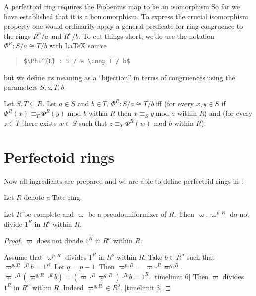 \documentclass[11pt]{article}
\begin{document}
A perfectoid ring requires the Frobenius map to be an isomorphism
So far we have established that it is a homomorphism.
To express the crucial isomorphism  property one would ordinarily 
apply a general predicate for ring congruence to the rings
$R^o/a$ and $R^o/b$. To cut things short, we do use the notation
$\Phi^{R} : S / a \cong T / b$ with 
\LaTeX{} source 
\begin{quotation}
\verb|$\Phi^{R} : S / a \cong T / b$|
\end{quotation}
but we define its meaning as a ``bijection'' in terms of congruences using the 
parameters $S,a,T,b$.
\begin{forthel}

\begin{definition} Let $S,T \subseteq R$. Let $a \in S$ and $b \in T$. 
$\Phi^{R} : S / a \cong T / b$
iff
(for every $x,y \in S$ if 
$\Phi^{R}(x) \equiv_{T} \Phi^{R}(y)$ mod $b$ within $R$ 
then $x \equiv_{S} y$ mod $a$ within $R$)
and
(for every $z \in T$ there exists $w \in S$ such that 
$z \equiv_{T} \Phi^{R}(w)$ mod $b$ within $R$).
\end{definition}

\end{forthel}

\section{Perfectoid rings}

Now all ingredients are prepared and we are able to define
perfectoid rings in \Naproche:

\begin{forthel}

Let $R$ denote a Tate ring.

\begin{lemma}
Let $R$ be complete and $\varpi$ be a pseudouniformizer of $R$.
Then $\varpi, \varpi^{p,R}$ do not divide $1^{R}$ in $R^o$ within $R$.
\end{lemma}
\begin{proof}
$\varpi$ does not divide $1^{R}$ in $R^o$ within $R$.

Assume that $\varpi^{p,R}$ divides $1^{R}$ in $R^o$ within $R$.
Take $b \in R^o$ such that $\varpi^{p,R} \cdot^{R} b = 1^{R}$.
Let $q = p -1$. Then  $\varpi^{p,R} = \varpi \cdot^{R} \varpi^{q,R}$.
$ \varpi \cdot^{R} (\varpi^{q,R} \cdot^{R} b) =
(\varpi \cdot^{R} \varpi^{q,R}) \cdot^{R} b =
1^{R}$.
[timelimit 6] 
Then $\varpi$ divides $1^{R}$ in $R^o$ within $R$. Indeed 
$\varpi^{q,R} \in R^o$.
[timelimit 3]
\end{proof}
\end{forthel}
\end{document}
